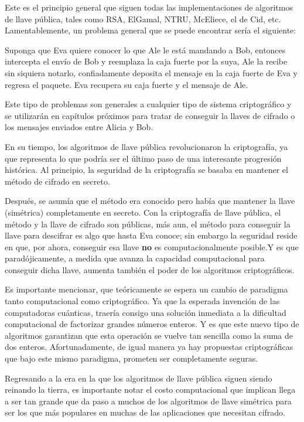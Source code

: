 Este es el principio general que siguen todas las implementaciones de algoritmos de llave pública, tales como RSA, ElGamal, NTRU, McEliece, el de Cid, etc. Lamentablemente, un problema general que se puede encontrar sería el siguiente:

 Suponga que Eva quiere conocer lo que  Ale le está mandando a Bob, entonces intercepta el envío de Bob y reemplaza la caja fuerte por la suya, Ale la recibe sin siquiera notarlo, confiadamente deposita el mensaje en la caja fuerte de Eva y regresa el paquete. Eva recupera su caja fuerte y el mensaje de Ale. 
 
 Este tipo de problemas son generales a cualquier tipo de sistema criptográfico y se utilizarán en capítulos próximos para tratar de conseguir la llaves de cifrado o los mensajes enviados entre Alicia y Bob.
  
 En su tiempo, los algoritmos de llave pública revolucionaron la criptografía, ya que representa  lo que podría ser el último paso de una interesante progresión histórica. Al principio, la seguridad de la criptografía se basaba en mantener el método de cifrado en secreto. 
 
 Después, se asumía que el método era conocido pero había que mantener la llave (simétrica) completamente en secreto. Con la criptografía de llave pública, el método y la llave de cifrado son públicas, más aun, el método para conseguir la llave para descifrar es algo que hasta Eva conoce; sin embargo la seguridad reside en que, por ahora, conseguir esa llave {\bf no} es computacionalmente posible.Y es que paradójicamente, a medida que avanza la capacidad computacional para conseguir dicha llave, aumenta también el poder de los algoritmos criptográficos.
 
 Es importante mencionar, que teóricamente se espera un cambio de paradigma tanto computacional como criptográfico. Ya que la esperada invención de las computadoras cuánticas, traería consigo una solución inmediata a la dificultad computacional de factorizar grandes números enteros. Y es que este nuevo tipo de algoritmos garantizan que esta operación se vuelve tan sencilla como la suma de dos enteros. Afortunadamente, de igual manera ya hay propuestas criptográficas que bajo este mismo paradigma, prometen ser completamente seguras.
 
Regresando a la era en la que los algoritmos de llave pública siguen siendo reinando la tierra, es importante notar el costo computacional que implican llega a ser tan grande que da paso a muchos de los algoritmos de llave simétrica para ser los que más populares en muchas de las aplicaciones que necesitan cifrado. 

